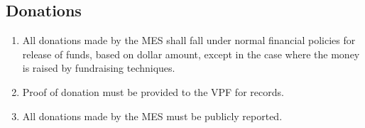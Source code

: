 \subsection{Donations}
\label{donations}
\begin{enumerate}
 \item
  All donations made by the MES shall fall under normal financial policies for release of funds, based on dollar amount, except in the case where the money is raised by fundraising techniques.
 \item
  Proof of donation must be provided to the VPF for records.
 \item
  All donations made by the MES must be publicly reported.
\end{enumerate}

% 
